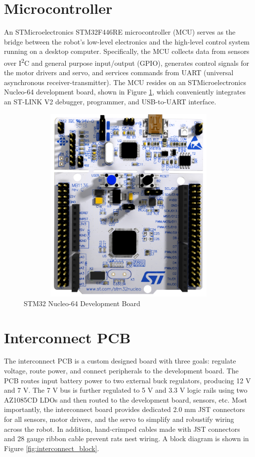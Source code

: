 \section{Microcontroller}
An STMicroelectronics STM32F446RE microcontroller (MCU) serves as the bridge between the robot's low-level electronics and the high-level control system running on a desktop computer. Specifically, the MCU collects data from sensors over I\textsuperscript{2}C and general purpose input/output (GPIO), generates control signals for the motor drivers and servo, and services commands from UART (universal asynchronous receiver-transmitter). The MCU resides on an STMicroelectronics Nucleo-64 development board, shown in Figure \ref{fig:nucleo64}, which conveniently integrates an ST-LINK V2 debugger, programmer, and USB-to-UART interface.

\begin{figure}[H]   %
	\centering \includegraphics[width=6in, height=3.85in, keepaspectratio]{figures/nucleo64.png}
	\caption{STM32 Nucleo-64 Development Board \cite{nucleo64_manual}}\label{fig:nucleo64}
\end{figure}

\section{Interconnect PCB}
The interconnect PCB is a custom designed board with three goals: regulate voltage, route power, and connect peripherals to the development board. The PCB routes input battery power to two external buck regulators, producing 12 V and 7 V. The 7 V bus is further regulated to 5 V and 3.3 V logic rails using two AZ1085CD LDOs and then routed to the development board, sensors, etc. Most importantly, the interconnect board provides dedicated 2.0 mm JST connectors for all sensors, motor drivers, and the servo to simplify and robustify wiring across the robot. In addition, hand-crimped cables made with JST connectors and 28 gauge ribbon cable prevent rats nest wiring. A block diagram is shown in Figure \ref{fig:interconnect_block}.

